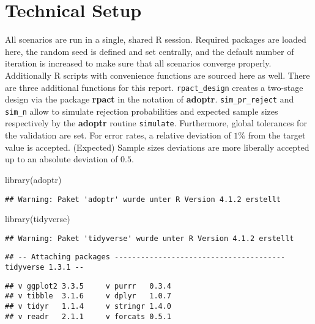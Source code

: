 \documentclass[
]{book}
\newenvironment{Shaded}{\begin{snugshade}}{\end{snugshade}}
\newcommand{\FunctionTok}[1]{\textcolor[rgb]{0.00,0.00,0.00}{#1}}
\newcommand{\NormalTok}[1]{#1}
\begin{document}
\hypertarget{technical-setup}{%
\section{Technical Setup}\label{technical-setup}}

All scenarios are run in a single, shared R session.
Required packages are loaded here,
the random seed is defined and set centrally, and the default number
of iteration is increased to make sure that all scenarios
converge properly.
Additionally R scripts with convenience functions are sourced here as well.
There are three additional functions for this report.
\texttt{rpact\_design} creates a two-stage design via the package \textbf{rpact} \citep{R-rpact}
in the notation of \textbf{adoptr}.
\texttt{sim\_pr\_reject} and \texttt{sim\_n} allow to simulate rejection probabilities
and expected sample sizes respectively by the \textbf{adoptr} routine \texttt{simulate}.
Furthermore, global tolerances for the validation are set.
For error rates, a relative deviation of \(1\%\) from the target value is
accepted.
(Expected) Sample sizes deviations are more liberally accepted up to an
absolute deviation of \(0.5\).

\begin{Shaded}
\begin{Highlighting}[]
\FunctionTok{library}\NormalTok{(adoptr)}
\end{Highlighting}
\end{Shaded}

\begin{verbatim}
## Warning: Paket 'adoptr' wurde unter R Version 4.1.2 erstellt
\end{verbatim}

\begin{Shaded}
\begin{Highlighting}[]
\FunctionTok{library}\NormalTok{(tidyverse)}
\end{Highlighting}
\end{Shaded}

\begin{verbatim}
## Warning: Paket 'tidyverse' wurde unter R Version 4.1.2 erstellt
\end{verbatim}

\begin{verbatim}
## -- Attaching packages --------------------------------------- tidyverse 1.3.1 --
\end{verbatim}

\begin{verbatim}
## v ggplot2 3.3.5     v purrr   0.3.4
## v tibble  3.1.6     v dplyr   1.0.7
## v tidyr   1.1.4     v stringr 1.4.0
## v readr   2.1.1     v forcats 0.5.1
\end{verbatim}
\end{document}
